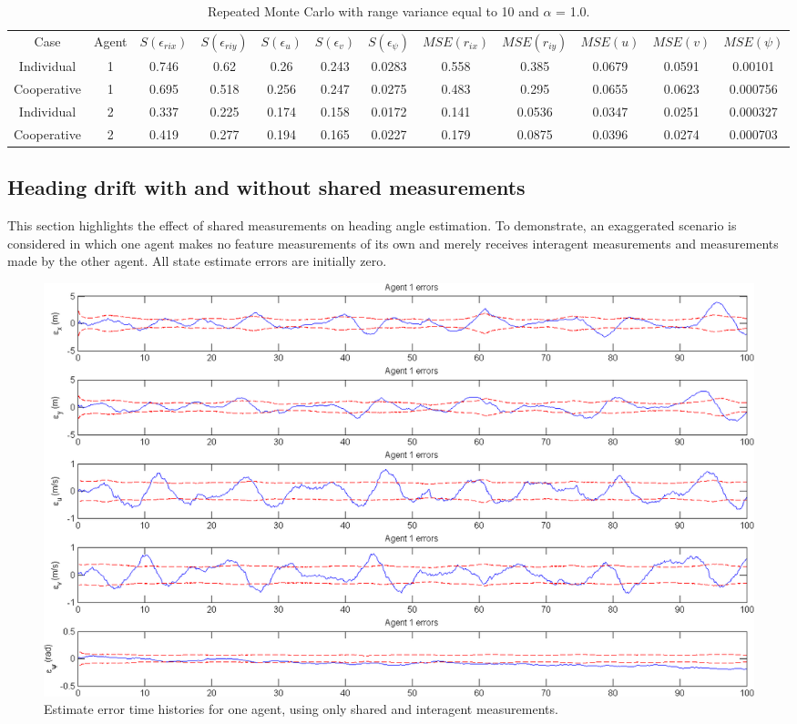 \documentclass{aiaa-tc}
\begin{document}
\begin{table}[tb!]
\scriptsize
\centering
\begin{tabular}{c|c|c|c|c|c|c|c|c|c|c|c|}
Case & Agent & $S(\epsilon_{rix})$ & $S(\epsilon_{riy})$ & $S(\epsilon_{u})$ & $S(\epsilon_{v})$ & $S(\epsilon_{\psi})$ & $MSE(r_{ix})$ & $MSE(r_{iy})$ & $MSE(u)$ & $MSE(v)$ & $MSE(\psi)$ \\
Individual & 1& 0.746& 0.62& 0.26& 0.243& 0.0283& 0.558& 0.385& 0.0679& 0.0591& 0.00101 \\
Cooperative & 1& 0.695& 0.518& 0.256& 0.247& 0.0275& 0.483& 0.295& 0.0655& 0.0623& 0.000756 \\
Individual & 2& 0.337& 0.225& 0.174& 0.158& 0.0172& 0.141& 0.0536& 0.0347& 0.0251& 0.000327 \\
Cooperative & 2& 0.419& 0.277& 0.194& 0.165& 0.0227& 0.179& 0.0875& 0.0396& 0.0274& 0.000703 \\
\end{tabular}
\caption{Repeated Monte Carlo with range variance equal to 10 and $\alpha$ = 1.0.}
\label{tab:alpha1_repeat}
\end{table}

\subsection{Heading drift with and without shared measurements}

This section highlights the effect of shared measurements on heading angle estimation. To demonstrate, an exaggerated scenario is considered in which one agent makes no feature measurements of its own and merely receives interagent measurements and measurements made by the other agent. All state estimate errors are initially zero.

\begin{figure}[p!]
\centering
\includegraphics[height=.4\textheight]{heading_drift.png}
\caption{Estimate error time histories for one agent, using only shared and interagent measurements.}
\label{fig:heading_drift}
\end{figure}
\end{document}
